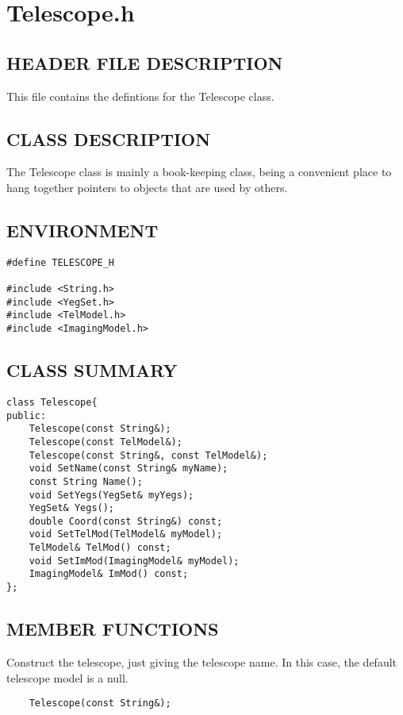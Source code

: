 \clearpage
\section{Telescope.h}

\subsection*{HEADER FILE DESCRIPTION}
  
   This file contains the defintions for the Telescope class.
  
\subsection*{CLASS DESCRIPTION}
  
   The Telescope class is mainly a book-keeping class, being a convenient
   place to hang together pointers to objects that are used by others.
  
\subsection*{ENVIRONMENT}
\begin{verbatim}
#define TELESCOPE_H

#include <String.h>
#include <YegSet.h>
#include <TelModel.h>
#include <ImagingModel.h>
\end{verbatim}

\subsection*{CLASS SUMMARY}
\begin{verbatim}
class Telescope{
public:
    Telescope(const String&);
    Telescope(const TelModel&);
    Telescope(const String&, const TelModel&);
    void SetName(const String& myName);
    const String Name();
    void SetYegs(YegSet& myYegs);
    YegSet& Yegs();
    double Coord(const String&) const;
    void SetTelMod(TelModel& myModel);
    TelModel& TelMod() const;
    void SetImMod(ImagingModel& myModel);
    ImagingModel& ImMod() const;
};
\end{verbatim}

\subsection*{MEMBER FUNCTIONS}

   Construct the telescope, just giving the telescope name. In this
   case, the default telescope model is a null.
\begin{verbatim}
    Telescope(const String&);
\end{verbatim}

